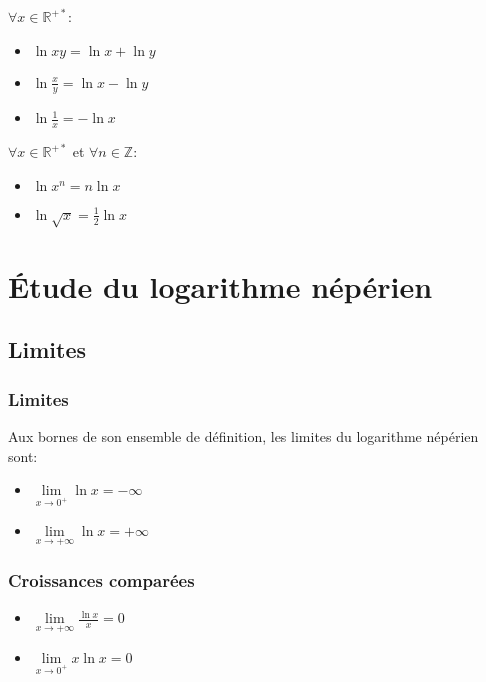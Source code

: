 \documentclass[a4paper]{article}
\begin{document}
{$\forall x \in \mathbb{R}^{+*}$:}

\begin{multicols}{3}
	\begin{itemize}
  		\item{$\ln{xy}=\ln{x}+\ln{y}$}
  		\item{$\ln{\frac{x}{y}=\ln{x}-\ln{y}}$}
  		\item{$\ln{\frac{1}{x}}=-\ln{x}$}
	\end{itemize}
\end{multicols}
{$\forall x \in \mathbb{R}^{+*}$ et $\forall n \in \mathbb{Z}$:}

\begin{multicols}{2}
	\begin{itemize}
		\item{$\ln{x^n}=n\ln{x}$}
		\item{$\ln{\sqrt{x}}=\frac{1}{2}\ln{x}$}
	\end{itemize}
\end{multicols}

\section{Étude du logarithme népérien}
\subsection{Limites}
\subsubsection{Limites}

{Aux bornes de son ensemble de définition, les limites du logarithme népérien sont:}

\begin{multicols}{2}
	\begin{itemize}
  		\item{$\lim\limits_{x \rightarrow 0^+} \ln{x}=-\infty$}
  		\item{$\lim\limits_{x \rightarrow +\infty} \ln{x}=+\infty$}
	\end{itemize}
\end{multicols}

\subsubsection{Croissances comparées}

\begin{multicols}{2}
	\begin{itemize}
  		\item{$\lim\limits_{x \rightarrow +\infty} \frac{\ln{x}}{x}=0$}
  		\item{$\lim\limits_{x \rightarrow 0^+} x\ln{x}=0$}
	\end{itemize}
\end{multicols}
\end{document}
